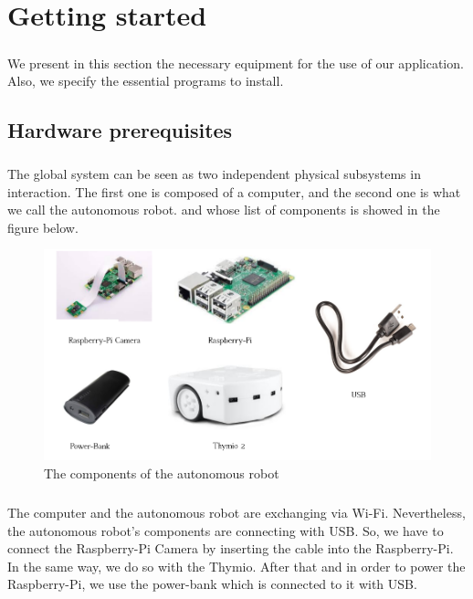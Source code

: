 \documentclass[12pt]{report}
\begin{document}
\chapter{Getting started}
\paragraph{}
We present in this section the necessary equipment for the use of our application. Also, we specify the essential programs to install.
\section{Hardware prerequisites}
\paragraph{}
The global system can be seen as two independent physical subsystems in interaction. The first one is composed of a computer, and the second one is what we call the autonomous robot. and whose list of components is showed in the figure below.
\begin{figure}[H]
	\begin{center}
		\includegraphics[scale=0.6]{comp.png}
		\caption{The components of the autonomous robot}
	\end{center}
\end{figure}
\paragraph{}
The computer and the autonomous robot are exchanging via Wi-Fi. Nevertheless, the autonomous robot's components are connecting with USB. So, we have to connect the Raspberry-Pi Camera by inserting the cable into the Raspberry-Pi. In the same way, we do so with the Thymio. After that and in order to power the Raspberry-Pi, we use the power-bank which is connected to it with USB. 
\end{document}
